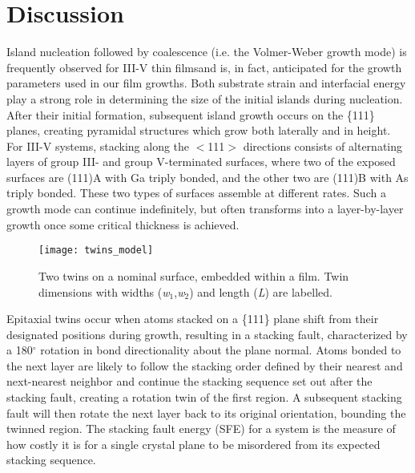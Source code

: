\section{Discussion}
Island nucleation followed by coalescence (i.e. the Volmer-Weber growth mode) is frequently observed for III-V thin films\cite{Ernst1989,Fang1990,Kim2010,Akahane2004}and is, in fact, anticipated for the growth parameters used in our film growths. Both substrate strain and interfacial energy play a strong role in determining the size of the initial islands during nucleation. After their initial formation, subsequent island growth occurs on the \{111\} planes, creating pyramidal structures which grow both laterally and in height. For III-V systems, stacking along the $<$111$>$ directions consists of alternating layers of group III- and group V-terminated surfaces, where two of the exposed surfaces are (111)A with Ga triply bonded, and the other two are (111)B with As triply bonded. These two types of surfaces assemble at different rates. Such a growth mode can continue indefinitely, but often transforms into a layer-by-layer growth once some critical thickness is achieved\cite{Tersoff1994}.
\begin{figure}
    \centering
    \texttt{[image: twins\_model]}
    \caption{\label{fig:twins_model}Two twins on a nominal surface, embedded within a film. Twin dimensions with widths (\textit{w}$_1$,\textit{w}$_2$) and length (\textit{L}) are labelled.}	
\end{figure}
Epitaxial twins occur when atoms stacked on a \{111\} plane shift from their designated positions during growth, resulting in a stacking fault, characterized by a 180$^\circ$ rotation in bond directionality about the plane normal. Atoms bonded to the next layer are likely to follow the stacking order defined by their nearest and next-nearest neighbor and continue the stacking sequence set out after the stacking fault, creating a rotation twin of the first region. A subsequent stacking fault will then rotate the next layer back to its original orientation, bounding the twinned region. The stacking fault energy (SFE) for a system is the measure of how costly it is for a single crystal plane to be misordered from its expected stacking sequence.

